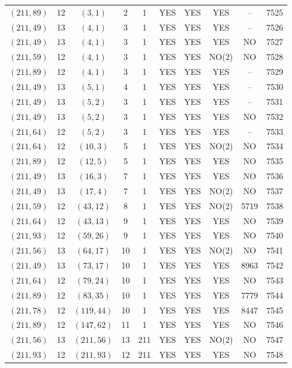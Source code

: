\begin{longtable}{|c|c|c|c|c|c|c|c|c|c|}
$(211, 89)$ & 12 & $(3, 1)$ & 2 & 1 & YES & YES & YES & -- & 7525\\
$(211, 49)$ & 13 & $(4, 1)$ & 3 & 1 & YES & YES & YES & -- & 7526\\
$(211, 49)$ & 13 & $(4, 1)$ & 3 & 1 & YES & YES & YES & NO & 7527\\
$(211, 59)$ & 12 & $(4, 1)$ & 3 & 1 & YES & YES & NO(2) & NO & 7528\\
$(211, 89)$ & 12 & $(4, 1)$ & 3 & 1 & YES & YES & YES & -- & 7529\\
$(211, 49)$ & 13 & $(5, 1)$ & 4 & 1 & YES & YES & YES & -- & 7530\\
$(211, 49)$ & 13 & $(5, 2)$ & 3 & 1 & YES & YES & YES & -- & 7531\\
$(211, 49)$ & 13 & $(5, 2)$ & 3 & 1 & YES & YES & YES & NO & 7532\\
$(211, 64)$ & 12 & $(5, 2)$ & 3 & 1 & YES & YES & YES & -- & 7533\\
$(211, 64)$ & 12 & $(10, 3)$ & 5 & 1 & YES & YES & NO(2) & NO & 7534\\
$(211, 89)$ & 12 & $(12, 5)$ & 5 & 1 & YES & YES & YES & NO & 7535\\
$(211, 49)$ & 13 & $(16, 3)$ & 7 & 1 & YES & YES & YES & NO & 7536\\
$(211, 49)$ & 13 & $(17, 4)$ & 7 & 1 & YES & YES & NO(2) & NO & 7537\\
$(211, 59)$ & 12 & $(43, 12)$ & 8 & 1 & YES & YES & NO(2) & 5719 & 7538\\
$(211, 64)$ & 12 & $(43, 13)$ & 9 & 1 & YES & YES & YES & NO & 7539\\
$(211, 93)$ & 12 & $(59, 26)$ & 9 & 1 & YES & YES & YES & NO & 7540\\
$(211, 56)$ & 13 & $(64, 17)$ & 10 & 1 & YES & YES & NO(2) & NO & 7541\\
$(211, 49)$ & 13 & $(73, 17)$ & 10 & 1 & YES & YES & YES & 8963 & 7542\\
$(211, 64)$ & 12 & $(79, 24)$ & 10 & 1 & YES & YES & YES & NO & 7543\\
$(211, 89)$ & 12 & $(83, 35)$ & 10 & 1 & YES & YES & YES & 7779 & 7544\\
$(211, 78)$ & 12 & $(119, 44)$ & 10 & 1 & YES & YES & YES & 8447 & 7545\\
$(211, 89)$ & 12 & $(147, 62)$ & 11 & 1 & YES & YES & YES & NO & 7546\\
$(211, 56)$ & 13 & $(211, 56)$ & 13 & 211 & YES & YES & NO(2) & NO & 7547\\
$(211, 93)$ & 12 & $(211, 93)$ & 12 & 211 & YES & YES & YES & NO & 7548\\

\end{longtable}
